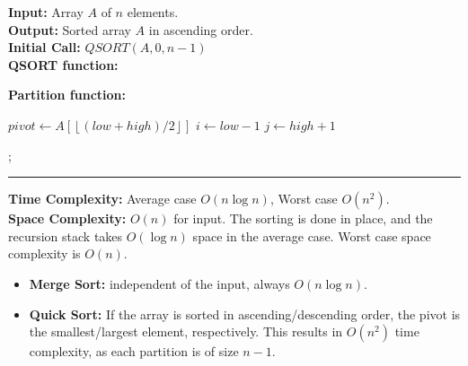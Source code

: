 \newpage 

\begin{Func}
    \textbf{Input:} Array $A$ of $n$ elements.\\
    \textbf{Output:} Sorted array $A$ in ascending order.\\
    \textbf{Initial Call:} $QSORT(A, 0, n-1)$\\

    \vspace{-.5em}
    \noindent
    \textbf{QSORT function:}\\
    \begin{algorithm}[H]
        \label{algo:quicksort}
    \end{algorithm}

    \vspace{.5em}

    \noindent
    \textbf{Partition function:}\\
    \begin{algorithm}[H]
        $pivot \gets A[\left\lfloor (low + high)/2 \right\rfloor]$\;
        $i \gets low - 1$\;
        $j \gets high + 1$\;
        
        ; 
    \end{algorithm}

    \noindent\rule{\textwidth}{0.4pt}

    \noindent
    \textbf{Time Complexity:} Average case $O(n \log n)$, Worst case $O(n^2)$.\\
    \textbf{Space Complexity:} $O(n)$ for input. The sorting is done in place, and the recursion stack takes $O(\log n)$ space in the average case. Worst case space complexity is $O(n)$.
\end{Func}


\vspace{-1em}
\begin{theo}

    \begin{itemize}
        \item \textbf{Merge Sort:} independent of the input, always $O(n \log n)$.
        \vspace{-.5em}
        \item \textbf{Quick Sort:} If the array is sorted in ascending/descending order, the pivot is the smallest/largest element, respectively. This results in $O(n^2)$ time complexity, as each partition is of size $n-1$.
    \end{itemize}
\end{theo}

